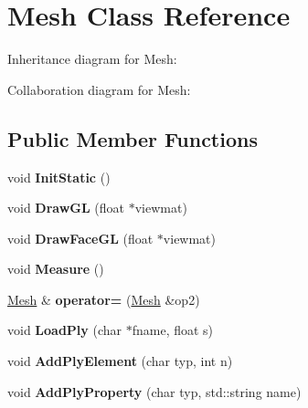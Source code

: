 \hypertarget{class_mesh}{\section{Mesh Class Reference}
\label{class_mesh}
}


Inheritance diagram for Mesh\+:


Collaboration diagram for Mesh\+:
\subsection*{Public Member Functions}
\begin{DoxyCompactItemize}
\item 
\hypertarget{class_mesh_a97448d8455545fc90caefad4bb7229e6}{void {\bfseries Init\+Static} ()}\label{class_mesh_a97448d8455545fc90caefad4bb7229e6}

\item 
\hypertarget{class_mesh_a30b9d387354e86f6828902ac68d87f56}{void {\bfseries Draw\+G\+L} (float $\ast$viewmat)}\label{class_mesh_a30b9d387354e86f6828902ac68d87f56}

\item 
\hypertarget{class_mesh_a5bfa6747badb0ffe9408947307202f5a}{void {\bfseries Draw\+Face\+G\+L} (float $\ast$viewmat)}\label{class_mesh_a5bfa6747badb0ffe9408947307202f5a}

\item 
\hypertarget{class_mesh_ad543586fabcbecb83312f42cf7ff3f9f}{void {\bfseries Measure} ()}\label{class_mesh_ad543586fabcbecb83312f42cf7ff3f9f}

\item 
\hypertarget{class_mesh_aaf1204625ed831f7484e50eafbc44d37}{\hyperlink{class_mesh}{Mesh} \& {\bfseries operator=} (\hyperlink{class_mesh}{Mesh} \&op2)}\label{class_mesh_aaf1204625ed831f7484e50eafbc44d37}

\item 
\hypertarget{class_mesh_ad7eed3cf625f63786e135b8c3c29208a}{void {\bfseries Load\+Ply} (char $\ast$fname, float s)}\label{class_mesh_ad7eed3cf625f63786e135b8c3c29208a}

\item 
\hypertarget{class_mesh_a5345af0b82eb6a55d27f166f16e41253}{void {\bfseries Add\+Ply\+Element} (char typ, int n)}\label{class_mesh_a5345af0b82eb6a55d27f166f16e41253}

\item 
\hypertarget{class_mesh_a6fae4adc8b7fa4e953eb6a9737602323}{void {\bfseries Add\+Ply\+Property} (char typ, std\+::string name)}\label{class_mesh_a6fae4adc8b7fa4e953eb6a9737602323}


\end{DoxyCompactItemize}
